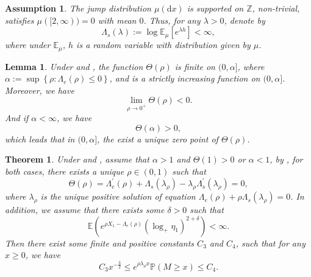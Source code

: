 \documentclass[10pt,a4paper]{amsart}
\newtheorem{assumption}{Assumption}
\newtheorem{lemma}{Lemma}
\newtheorem{theorem}{Theorem}
\newcommand{\E}{\mathbb{E}}
\renewcommand{\P}{\mathbb{P}}
\renewcommand{\d}{\mathrm{d}}
\begin{document}
	\begin{assumption}\label{Jump Assumption}
		The jump distribution $\mu(\d x)$ is  supported on $\mathbb{Z}$, non-trivial, satisfies $\mu([2,\infty)) = 0$ with mean $0$. Thus, for any $\lambda>0$, denote by
		\begin{equation}
			\Lambda_s(\lambda):=\log \E_\mu\left[ e^{\lambda h}\right]<\infty,
		\end{equation}
	where under $\E_\mu$, $h$ is a random variable with distribution given by $\mu$. 
	\end{assumption}

	\begin{lemma}\label{Classify}
		Under and ,
		the function $\varTheta(\rho)$ is finite on $(0,\alpha]$, where $\alpha:=\sup\left\{\rho:\Lambda_e(\rho)\leqslant 0\right\}$, and is a strictly increasing function on $(0,\alpha]$. Moreover, we have 
		\begin{equation}
			\lim\limits_{\rho\rightarrow 0^+} \varTheta(\rho)<0.
		\end{equation}
		And if $\alpha<\infty$, we have
		\begin{equation}
			\varTheta(\alpha)>0,
		\end{equation}
		which leads that in $ (0,\alpha] $, the exist a unique zero point of $\varTheta(\rho)$.
	\end{lemma}

	\begin{theorem}\label{Theorem of weakly cases}
		Under  and , assume that $\alpha>1$ and $\varTheta(1)>0$ or $\alpha<1$, by , for both cases, there exists a unique $\rho\in(0,1)$ such that
		\begin{equation}\label{25}
			\varTheta(\rho)= \Lambda_e^\prime(\rho) + \Lambda_s(\lambda_\rho) -\lambda_\rho \Lambda_s^\prime(\lambda_\rho) = 0,
		\end{equation}
		where $\lambda_\rho$ is the unique positive solution of equation $\Lambda_e(\rho)+\rho\Lambda_s(\lambda_\rho) =0$.
		In addition, we assume that there exists some $\delta>0$ such that
		\begin{equation}\label{additional assumption for weakly}
			\E\left(e^{\rho X_1-\Lambda_e(\rho)} (\log_+ \eta_1)^{2+\delta}\right)<\infty.
		\end{equation}
		Then there exist some finite and positive constants $C_3$ and $C_4$, such that for any $x\geqslant 0$, we have
		\begin{equation}
			C_3 x^{-\frac{3}{2}} \leqslant e^{\rho\lambda_\rho x }\P(M\geqslant x ) \leqslant C_4.
		\end{equation}
	\end{theorem}
\end{document}
